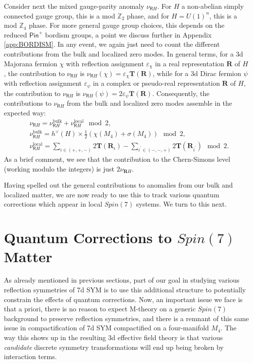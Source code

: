 \documentclass[12pt]{article}%
\numberwithin{equation}{section}
\renewcommand{\(}{\left(}
\renewcommand{\)}{\right)}
\renewcommand{\[}{\left[}
\renewcommand{\]}{\right]}
\begin{document}
Consider next the mixed gauge-parity anomaly $\nu_{\mathsf{R} H}$. For $H$ a non-abelian simply connected gauge group, this is a mod $\mathbb{Z}_2$ phase, and for $H = U(1)^n$, this is a mod $\mathbb{Z}_4$ phase. For more general gauge group choices, this depends on the reduced $\mathsf{Pin}^{+}$ bordism groups, a point we discuss further in Appendix \ref{app:BORDISM}. In any event, we again just need to count the different contributions from the bulk and localized zero modes. In general terms, for a 3d Majorana fermion $\chi$ with reflection assignment $\varepsilon_{\chi}$ in a real representation $\mathbf{R}$ of $H$, the contribution to $\nu_{\mathsf{R} H}$ is
$\nu_{\mathsf{R} H}(\chi) = \varepsilon_{\chi} \mathbf{T}(\mathbf{R})$, while for a 3d Dirac fermion $\psi$ with reflection assignment
$\varepsilon_{\psi}$ in a complex or pseudo-real representation $\mathbf{R}$ of $H$,
the contribution to $\nu_{\mathsf{R} H}$ is
$\nu_{\mathsf{R} H}(\psi) = 2 \varepsilon_{\psi} \mathbf{T}(\mathbf{R})$.
Consequently, the contributions to $\nu_{\mathsf{R} H}$ from
the bulk and localized zero modes assemble in the expected way:
\begin{align}
& \nu_{\mathsf{R}H}  = \nu^{\mathrm{bulk}}_{\mathsf{R}H} + \nu^{\mathrm{local}}_{\mathsf{R}H} \mod 2, \\
& \nu^{\mathrm{bulk}}_{\mathsf{R}H} = h^{\lor}(H) \times \frac{1}{2}( \chi(M_4) + \sigma(M_4)) \mod 2, \\
& \nu^{\mathrm{local}}_{\mathsf{R}H} =
\underset{i \in (+,+,-)}{\sum} 2\mathbf{T}(\mathbf{R}_{i}) - \underset{i^{\prime} \in (-,-,+)}{\sum} 2\mathbf{T}(\mathbf{R}_{i^{\prime}}) \mod 2.
\end{align}
As a brief comment, we see that the contribution to the Chern-Simons
level (working modulo the integers) is just $2 \nu_{\mathbf{R} H}$.

Having spelled out the general contributions to anomalies from our
bulk and localized matter, we are now ready to use this to track
various quantum corrections which appear in local $Spin(7)$ systems.
We turn to this next.

\section{Quantum Corrections to $Spin(7)$ Matter \label{sec:QUANTUM}}

As already mentioned in previous sections, part of our goal in studying various reflection symmetries
of 7d SYM is to use this additional structure to potentially constrain the effects of quantum corrections.
Now, an important issue we face is that a priori, there is no reason to expect M-theory on a generic $Spin(7)$ background
to preserve reflection symmetries, and there is a remnant of this same issue in compactification of 7d SYM compactified on a
four-manifold $M_4$. The way this shows up in the resulting 3d effective field theory is that various \textit{candidate}
discrete symmetry transformations will end up being broken by interaction terms.
\end{document}
